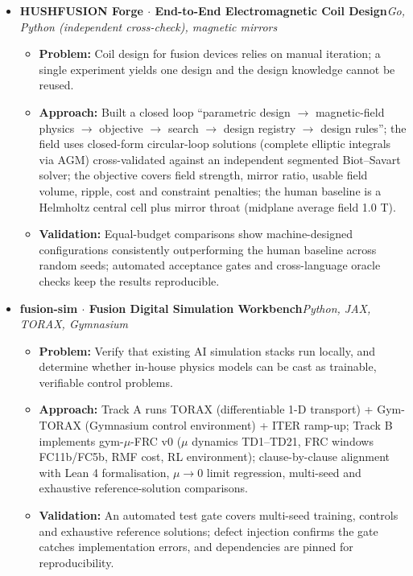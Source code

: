 \documentclass[10pt,a4paper]{article}
\newcommand{\resumeItem}[1]{\item \small #1}
\begin{document}
\begin{itemize}[leftmargin=0.15in, label={}, topsep=2pt]

\item \textbf{HUSHFUSION Forge $\cdot$ End-to-End Electromagnetic Coil Design}\hfill\textit{\small Go, Python (independent cross-check), magnetic mirrors}
\begin{itemize}[topsep=1pt, label=\textbullet]
\resumeItem{\textbf{Problem:} Coil design for fusion devices relies on manual iteration; a single experiment yields one design and the design knowledge cannot be reused.}
\resumeItem{\textbf{Approach:} Built a closed loop ``parametric design $\to$ magnetic-field physics $\to$ objective $\to$ search $\to$ design registry $\to$ design rules''; the field uses closed-form circular-loop solutions (complete elliptic integrals via AGM) cross-validated against an independent segmented Biot--Savart solver; the objective covers field strength, mirror ratio, usable field volume, ripple, cost and constraint penalties; the human baseline is a Helmholtz central cell plus mirror throat (midplane average field 1.0 T).}
\resumeItem{\textbf{Validation:} Equal-budget comparisons show machine-designed configurations consistently outperforming the human baseline across random seeds; automated acceptance gates and cross-language oracle checks keep the results reproducible.}
\end{itemize}

\item \textbf{fusion-sim $\cdot$ Fusion Digital Simulation Workbench}\hfill\textit{\small Python, JAX, TORAX, Gymnasium}
\begin{itemize}[topsep=1pt, label=\textbullet]
\resumeItem{\textbf{Problem:} Verify that existing AI simulation stacks run locally, and determine whether in-house physics models can be cast as trainable, verifiable control problems.}
\resumeItem{\textbf{Approach:} Track A runs TORAX (differentiable 1-D transport) + Gym-TORAX (Gymnasium control environment) + ITER ramp-up; Track B implements gym-$\mu$-FRC v0 ($\mu$ dynamics TD1--TD21, FRC windows FC11b/FC5b, RMF cost, RL environment); clause-by-clause alignment with Lean 4 formalisation, $\mu\to 0$ limit regression, multi-seed and exhaustive reference-solution comparisons.}
\resumeItem{\textbf{Validation:} An automated test gate covers multi-seed training, controls and exhaustive reference solutions; defect injection confirms the gate catches implementation errors, and dependencies are pinned for reproducibility.}
\end{itemize}

\end{itemize}
\end{document}

